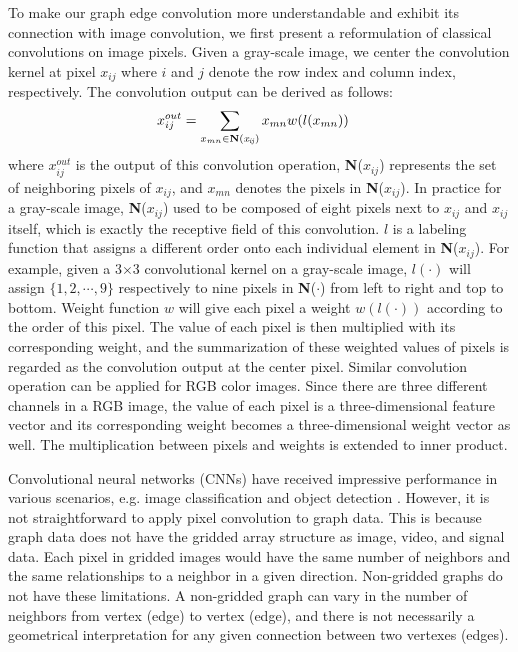 \documentclass[a4paper,11pt]{article}
\begin{document}
To make our graph edge convolution more understandable and exhibit its connection with image convolution, we first present a reformulation of classical convolutions on image pixels. Given a gray-scale image, we center the convolution kernel at pixel $x_{ij}$ where $i$ and $j$ denote the row index and column index, respectively. The convolution output can be derived as follows:
\begin{align}
  &x_{ij}^{out} = \sum_{x_{mn} \in {\bf N({\it x_{ij}})} } x_{mn}w(l(x_{mn}))&
\end{align}
where $x_{ij}^{out}$ is the output of this convolution operation, {\bf N}($x_{ij}$) represents the set of neighboring pixels of $x_{ij}$, and $x_{mn}$ denotes the pixels in {\bf N}($x_{ij}$). In practice for a gray-scale image, {\bf N}($x_{ij}$) used to be composed of eight pixels next to $x_{ij}$ and $x_{ij}$ itself, which is exactly the receptive field of this convolution. $l$ is a labeling function that assigns a different order onto each individual element in {\bf N}($x_{ij}$). For example, given a 3$\times$3 convolutional kernel on a gray-scale image, $l(\cdot)$ will assign $\{1, 2, \cdots, 9\}$ respectively to nine pixels in {\bf N}($\cdot$) from left to right and top to bottom.  Weight function $w$ will give each pixel a weight $w(l(\cdot))$ according to the order of this pixel. The value of each pixel is then multiplied with its corresponding weight, and the summarization of these weighted values of pixels is regarded as the convolution output at the center pixel. Similar convolution operation can be applied for RGB color images. Since there are three different channels in a RGB image, the value of each pixel is a three-dimensional feature vector and its corresponding weight becomes a three-dimensional weight vector as well. The multiplication between pixels and weights is extended to inner product. 


Convolutional neural networks (CNNs) have received impressive performance in various scenarios, e.g. image classification and object detection \cite{ge2016robust,krizhevsky2012imagenet,redmon2016you,ren2015faster,simonyan2014very,zhang20173,xiong2017learning}. However, it is not straightforward to apply pixel convolution to graph data. This is because graph data does not have the gridded array structure as image, video, and signal data. Each pixel in gridded images would have the same number of neighbors and the same relationships to a neighbor in a given direction. Non-gridded graphs do not have these limitations. A non-gridded graph can vary in the number of neighbors from vertex (edge) to vertex (edge), and there is not necessarily a geometrical interpretation for any given connection between two vertexes (edges).
\end{document}
